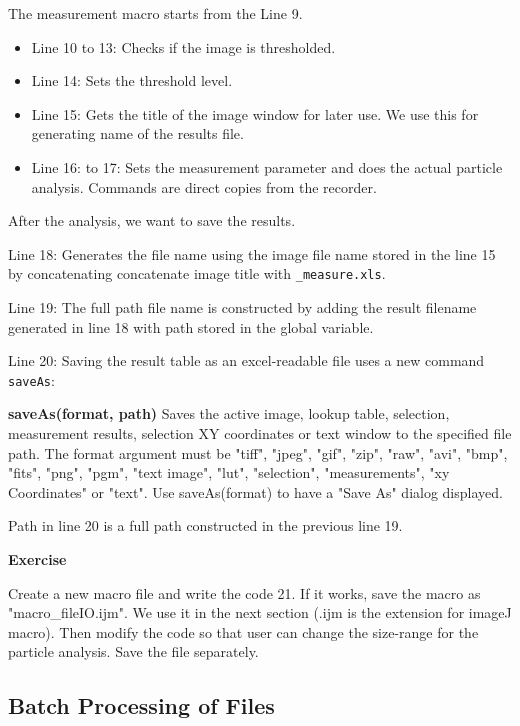 \documentclass[11pt,a4paper,oneside]{report}
\newenvironment{indentexercise}[1]%
{{\setlength{\leftmargin}{2em}}%
\textbf{Exercise \thesubsection-#1}%
\begin{list}{}%
	\item%
}
{\end{list}}
\newenvironment{indentCom}%
{\begin{list}{}%
         {\setlength{\leftmargin}{1em}}%
         \item[]%
}
{\end{list}}
\newcommand{\ilcom}[1]{\texttt{\small#1}}
\begin{document}
The measurement macro starts from the Line 9. 
\begin{itemize}
\item Line 10 to 13: Checks if the image is thresholded. 
\item Line 14: Sets the threshold level. 
\item Line 15: Gets the title of the image window for later use. We use this for 
generating name of the results file.
\item Line 16: to 17: Sets the measurement parameter and does the actual 
particle analysis. Commands are direct copies from the recorder. 
\end{itemize}
After the analysis, we want to save the results. 
\begin{itemize}
\item Line 18: Generates the file name using the image file name stored in the line 15 by concatenating concatenate image title with \ilcom{\_measure.xls}. 
\item Line 19: The full path file name is constructed by adding the result filename generated in line 18 with path stored in the global variable. 
\item Line 20: Saving the result table as an excel-readable file uses a new command \ilcom{saveAs}:
\begin{indentCom}
\textbf{saveAs(format, path)}
Saves the active image, lookup table, selection, measurement results, selection XY coordinates or text window to the specified file path. The format argument must be "tiff", "jpeg", "gif", "zip", "raw", "avi", "bmp", "fits", "png", "pgm", "text image", "lut", "selection", "measurements", "xy Coordinates" or "text". Use saveAs(format) to have a "Save As" dialog displayed.
\end{indentCom}
Path in line 20 is a full path constructed in the previous line 19.
\end{itemize}

\begin{indentexercise}{1}
Create a new macro file and write the code 21. If it works, save the macro as "macro\_fileIO.ijm". We use it in the next section (.ijm is the extension for imageJ macro). 
Then modify the code so that user can change the size-range for the particle analysis. Save the file separately.   
\end{indentexercise}

\subsection{Batch Processing of Files}
\end{document}
